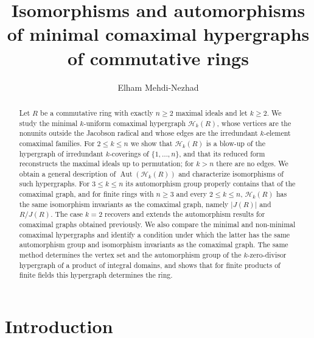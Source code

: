 \documentclass{amsart}
\theoremstyle{definition}
\theoremstyle{remark}
\newcommand{\Aut}{\operatorname{Aut}}
\newcommand{\cH}{\mathcal{H}}
\begin{document}
\title[Minimal comaximal hypergraphs]{Isomorphisms and automorphisms of minimal comaximal hypergraphs of commutative rings}

\author{Elham Mehdi-Nezhad}
\address{Department of Mathematics and Applied Mathematics, University of the Western Cape, Private Bag X17, Bellville 7535, Cape Town, South Africa}




\begin{abstract}
Let $R$ be a commutative ring with exactly $n\ge 2$ maximal ideals and let $k\ge 2$. We study the minimal $k$-uniform comaximal hypergraph $\cH_k(R)$, whose vertices are the nonunits outside the Jacobson radical and whose edges are the irredundant $k$-element comaximal families. For $2\le k\le n$ we show that $\cH_k(R)$ is a blow-up of the hypergraph of irredundant $k$-coverings of $\{1,\dots,n\}$, and that its reduced form reconstructs the maximal ideals up to permutation; for $k>n$ there are no edges. We obtain a general description of $\Aut(\cH_k(R))$ and characterize isomorphisms of such hypergraphs. For $3\le k\le n$ its automorphism group properly contains that of the comaximal graph, and for finite rings with $n\ge 3$ and every $2\le k\le n$, $\cH_k(R)$ has the same isomorphism invariants as the comaximal graph, namely $|J(R)|$ and $R/J(R)$. The case $k=2$ recovers and extends the automorphism results for comaximal graphs obtained previously. We also compare the minimal and non-minimal comaximal hypergraphs and identify a condition under which the latter has the same automorphism group and isomorphism invariants as the comaximal graph. The same method determines the vertex set and the automorphism group of the $k$-zero-divisor hypergraph of a product of integral domains, and shows that for finite products of finite fields this hypergraph determines the ring.
\end{abstract}

\maketitle

\section{Introduction}
\end{document}
